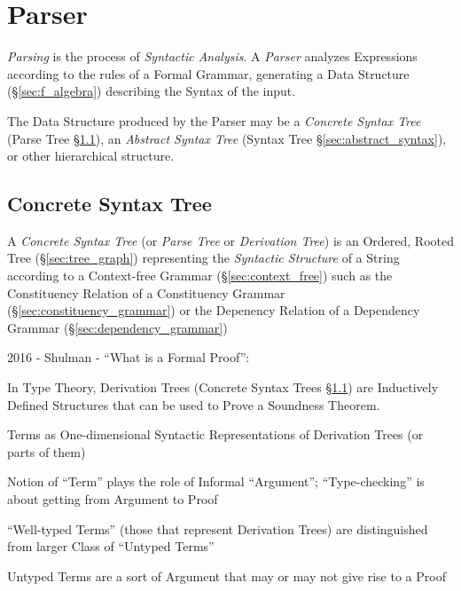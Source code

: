 \section{Parser} \label{sec:parser}

\emph{Parsing} is the process of \emph{Syntactic Analysis}. A
\emph{Parser} analyzes Expressions according to the rules of a Formal
Grammar, generating a Data Structure (\S\ref{sec:f_algebra})
describing the Syntax of the input.

The Data Structure produced by the Parser may be a \emph{Concrete
  Syntax Tree} (Parse Tree \S\ref{sec:concrete_syntax}), an
\emph{Abstract Syntax Tree} (Syntax Tree \S\ref{sec:abstract_syntax}),
or other hierarchical structure.



\subsection{Concrete Syntax Tree}\label{sec:concrete_syntax}

A \emph{Concrete Syntax Tree} (or \emph{Parse Tree} or
\emph{Derivation Tree}) is an Ordered, Rooted Tree
(\S\ref{sec:tree_graph}) representing the \emph{Syntactic Structure}
of a String according to a Context-free Grammar
(\S\ref{sec:context_free}) such as the Constituency Relation of a
Constituency Grammar (\S\ref{sec:constituency_grammar}) or the
Depenency Relation of a Dependency Grammar
(\S\ref{sec:dependency_grammar})


2016 - Shulman - ``What is a Formal Proof'': %

In Type Theory, Derivation Trees (Concrete Syntax Trees
\S\ref{sec:concrete_syntax}) are Inductively Defined Structures that
can be used to Prove a Soundness Theorem.

Terms as One-dimensional Syntactic Representations of Derivation Trees
(or parts of them)

Notion of ``Term'' plays the role of Informal ``Argument'';
``Type-checking'' is about getting from Argument to Proof

``Well-typed Terms'' (those that represent Derivation Trees) are
distinguished from larger Class of ``Untyped Terms''

Untyped Terms are a sort of Argument that may or may not give rise to
a Proof

